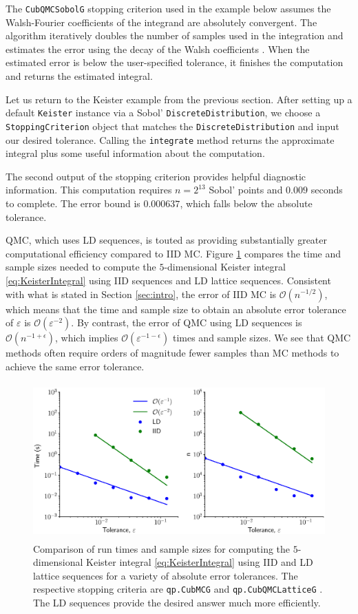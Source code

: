 \documentclass[graybox]{svmult}
\begin{document}
The \texttt{CubQMCSobolG} stopping criterion used in the example below assumes the Walsh-Fourier coefficients of the integrand are absolutely convergent. The algorithm iteratively doubles the number of samples used in the integration and estimates the error using the decay of the Walsh coefficients \cite{HicJim16a}. When the estimated error is below the user-specified tolerance, it finishes the computation and returns the estimated integral.

Let us return to the Keister example from the previous section.  After setting up  a default \texttt{Keister} instance via a Sobol' \texttt{DiscreteDistribution}, we choose a \texttt{StoppingCriterion} object that matches the \texttt{DiscreteDistribution} and input our desired tolerance.  Calling the  \texttt{integrate} method returns the approximate integral plus some useful information about the computation.

The second output of the stopping criterion provides helpful diagnostic information.  This computation requires $n=2^{13}$ Sobol' points and $0.009$ seconds to complete.  The error bound is $0.000637$, which falls below the absolute tolerance.

QMC, which uses LD sequences, is touted as providing substantially greater computational efficiency compared to IID MC.
Figure \ref{fig:sc_comp} compares the time and sample sizes needed to compute the $5$-dimensional Keister integral \eqref{eq:KeisterIntegral} using IID sequences and LD lattice sequences. Consistent with what is stated in Section \ref{sec:intro}, the error of IID MC is $\mathcal{O}(n^{-1/2})$, which means that the time and sample size to obtain an absolute error tolerance of $\varepsilon$ is $\mathcal{O}(\varepsilon^{-2})$.  By contrast, the  error of QMC using LD sequences is $\mathcal{O}(n^{-1+\epsilon})$, which implies $\mathcal{O}(\varepsilon^{-1-\epsilon})$ times and sample sizes.  We see that QMC methods often require orders of magnitude fewer samples than MC methods to achieve the same error tolerance.

\begin{figure}[t]
	\includegraphics[height=6cm]{QMCSoftwareArticle/vfigs/sc_comp.eps}
	\caption{Comparison of run times and sample sizes for computing the $5$-dimensional Keister integral \eqref{eq:KeisterIntegral} using IID and LD lattice sequences for a variety of absolute error tolerances. The respective stopping criteria are  \texttt{qp.CubMCG} \cite{HicEtal14a} and  \texttt{qp.CubQMCLatticeG} \cite{JimHic16a}. The LD sequences provide the desired answer much more efficiently.}
	\label{fig:sc_comp}
\end{figure}
\end{document}
